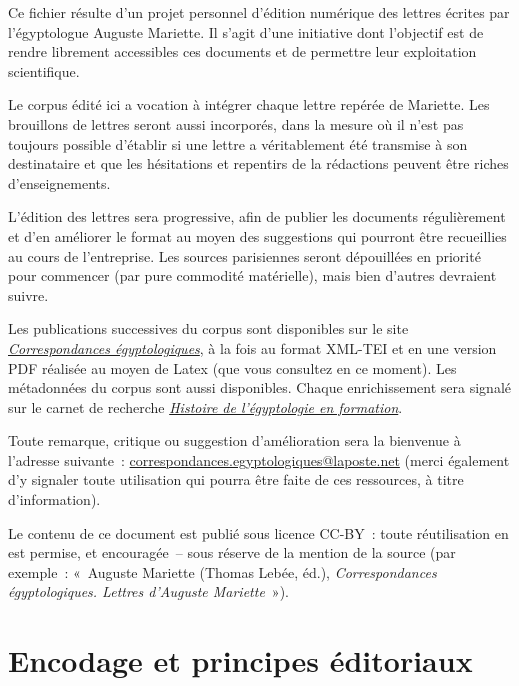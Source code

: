 \documentclass{book}
\begin{document}
Ce fichier résulte d’un projet personnel d’édition numérique des lettres écrites par l’égyptologue Auguste Mariette. Il s’agit d’une initiative dont l’objectif est de rendre librement accessibles ces documents et de permettre leur exploitation scientifique.
\par Le corpus édité ici a vocation à intégrer chaque lettre repérée de Mariette. Les brouillons de lettres seront aussi incorporés, dans la mesure où il n’est pas toujours possible d’établir si une lettre a véritablement été transmise à son destinataire et que les hésitations et repentirs de la rédactions peuvent être riches d’enseignements.
\par L’édition des lettres sera progressive, afin de publier les documents régulièrement et d’en améliorer le format au moyen des suggestions qui pourront être recueillies au cours de l’entreprise. Les sources parisiennes seront dépouillées en priorité pour commencer (par pure commodité matérielle), mais bien d’autres devraient suivre.
\par Les publications successives du corpus sont disponibles sur le site \href{https://thlebee.github.io/CoEg_test_forty/}{\textit{Correspondances égyptologiques}}, à la fois au format XML-TEI et en une version PDF réalisée au moyen de Latex (que vous consultez en ce moment). Les métadonnées du corpus sont aussi disponibles. Chaque enrichissement sera signalé sur le carnet de recherche \href{https://hef.hypotheses.org/}{\textit{Histoire de l’égyptologie en formation}}.
\par Toute remarque, critique ou suggestion d’amélioration sera la bienvenue à l’adresse suivante~: \href{mailto:correspondances.egyptologiques@laposte.net}{correspondances.egyptologiques@laposte.net} (merci également d’y signaler toute utilisation qui pourra être faite de ces ressources, à titre d’information).
\par Le contenu de ce document est publié sous licence CC-BY~: toute réutilisation en est permise, et encouragée~– sous réserve de la mention de la source (par exemple~: «~Auguste Mariette (Thomas Lebée, éd.), \textit{Correspondances égyptologiques. Lettres d’Auguste Mariette}~»).

\section*{Encodage et principes éditoriaux}
\end{document}
